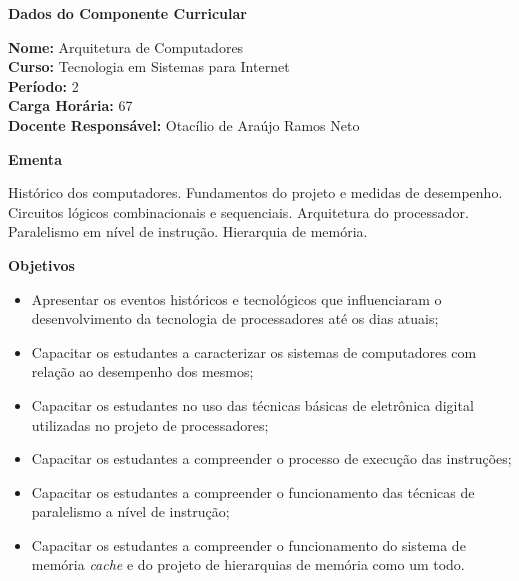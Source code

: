 

\begin{snugshade}\begin{center}\textbf{
	Dados do Componente Curricular
}\end{center}\end{snugshade}

\noindent 	\textbf{Nome:} Arquitetura de Computadores
\\ 			\textbf{Curso:} Tecnologia em Sistemas para Internet
\\ 			\textbf{Período:} \unit{2}{\degree}
\\ 			\textbf{Carga Horária:} \unit{67}{\hour}
\\ 			\textbf{Docente Responsável:} Otacílio de Araújo Ramos Neto


\begin{snugshade}\begin{center}\textbf{
    Ementa
\vphantom{q}}\end{center}\end{snugshade}

\noindent
Histórico dos computadores. Fundamentos do projeto e medidas de desempenho. Circuitos lógicos combinacionais e sequenciais. Arquitetura do processador. Paralelismo em nível de instrução. Hierarquia de memória. 

\begin{snugshade}\begin{center}\textbf{
    Objetivos
}\end{center}\end{snugshade}


\begin{itemize}

\item Apresentar os eventos históricos e tecnológicos que influenciaram o desenvolvimento da tecnologia de processadores até os dias atuais;
\item Capacitar os estudantes a caracterizar os sistemas de computadores com relação ao desempenho dos mesmos;
\item Capacitar os estudantes no uso das técnicas básicas de eletrônica digital utilizadas no projeto de processadores;
\item Capacitar os estudantes a compreender o processo de execução das instruções;
\item Capacitar os estudantes a compreender o funcionamento das técnicas de paralelismo a nível de instrução;
\item Capacitar os estudantes a compreender o funcionamento do sistema de memória \textit{cache} e do projeto de hierarquias de memória como um todo.

\end{itemize} 

